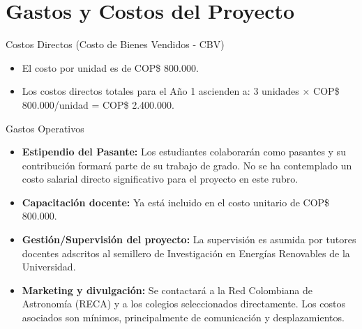 \section{Gastos y Costos del Proyecto}

\begin{frame}{Costos Directos (Costo de Bienes Vendidos - CBV)}
    \begin{itemize}
        \item El costo por unidad es de COP\$ 800.000.
        \item Los costos directos totales para el Año 1 ascienden a: 
					3 unidades $\times$ COP\$ 800.000/unidad = COP\$ 2.400.000.
    \end{itemize}
\end{frame}

\begin{frame}{Gastos Operativos}
    \begin{itemize}
        \item \textbf{Estipendio del Pasante:} Los estudiantes colaborarán 
					como pasantes y su contribución formará parte de su trabajo de grado. 
					No se ha contemplado un costo salarial directo significativo para el 
					proyecto en este rubro. 
        \item \textbf{Capacitación docente:} Ya está incluido en el costo 
					unitario de COP\$ 800.000. 
        \item \textbf{Gestión/Supervisión del proyecto:} La supervisión es 
					asumida por tutores docentes adscritos al semillero de Investigación 
					en Energías Renovables de la Universidad. 
        \item \textbf{Marketing y divulgación:} Se contactará a la Red 
					Colombiana de Astronomía (RECA) y a los colegios seleccionados 
					directamente. Los costos asociados son mínimos, principalmente de 
					comunicación y desplazamientos.  
    \end{itemize}
\end{frame}

